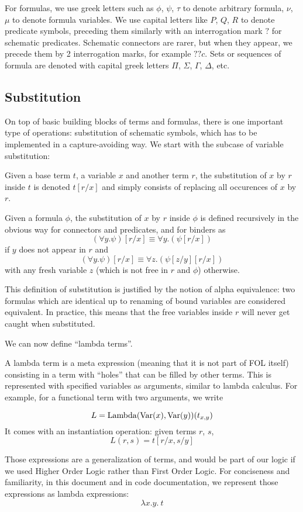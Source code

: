 For formulas, we use greek letters such as $\phi$, $\psi$, $\tau$ to denote arbitrary formula, $\nu$, $\mu$ to denote formula variables. We use capital letters like $P$, $Q$, $R$ to denote predicate symbols, preceding them similarly with an interrogation mark $?$ for schematic predicates. Schematic connectors are rarer, but when they appear, we precede them by 2 interrogation marks, for example $??c$. Sets or sequences of formula are denoted with capital greek letters $\Pi$, $\Sigma$, $\Gamma$, $\Delta$, etc.

\subsection{Substitution}
\label{subs:substitution}
On top of basic building blocks of terms and formulas, there is one important type of operations: substitution of schematic symbols, which has to be implemented in a capture-avoiding way. We start with the subcase of variable substitution:
\begin{defin}
  Given a base term $t$, a variable $x$ and another term $r$, the substitution of $x$ by $r$ inside $t$ is denoted $ t[r/x] $ and simply consists of replacing all occurences of $x$ by $r$.

  Given a formula $\phi$, the substitution of $x$ by $r$ inside $\phi$ is defined recursively in the obvious way for connectors and predicates, and for binders as
  $$
    (\forall y. \psi)[r/x] \equiv \forall y. (\psi[r/x])
  $$
  if $y$ does not appear in $r$ and
  $$
    (\forall y. \psi)[r/x] \equiv \forall z. (\psi[z/y][r/x])
  $$
  with any fresh variable $z$ (which is not free in $r$ and $\phi$) otherwise.
\end{defin}


This definition of substitution is justified by the notion of alpha equivalence: two formulas which are identical up to renaming of bound variables are considered equivalent. In practice, this means that the free variables inside $r$ will never get caught when substituted.

We can now define \enquote{lambda terms}.
\begin{defin}
  A lambda term is a  meta expression (meaning that it is not part of FOL itself) consisting in a term with ``holes'' that can be filled by other terms. This is represented with specified variables as arguments, similar to lambda calculus. For example, for a functional term with two arguments, we write

  $$
    L = \operatorname{Lambda}(\operatorname{Var}(x), \operatorname{Var}(y))(t_{x,y})
  $$
  It comes with an instantiation operation: given terms $r$, $s$,
  $$L(r, s) = t[r/x, s/y]$$
\end{defin}
Those expressions are a generalization of terms, and would be part of our logic if we used Higher Order Logic rather than First Order Logic. For conciseness and familiarity, in this document and in code documentation, we represent those expressions as lambda expressions:
$$
  \lambda x.y. ~t
$$

